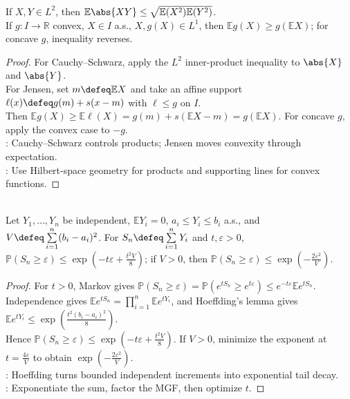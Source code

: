 \begin{theorem} \label{thm:cauchy-schwarz-and-jensen-expectations} \\
If $X,Y\in L^2$, then $\mathbb{E}\abs{XY}\leq\sqrt{\mathbb{E}(X^2)\mathbb{E}(Y^2)}$.\\
If $g:I\to\mathbb{R}$ convex, $X\in I$ a.s., $X,g(X)\in L^1$, then $\mathbb{E}g(X)\geq g(\mathbb{E}X)$; for concave $g$, inequality reverses.
\begin{proof}
For Cauchy--Schwarz, apply the $L^2$ inner-product inequality to $\abs{X}$ and $\abs{Y}$.\\
For Jensen, set $m\defeq\mathbb{E}X$ and take an affine support $\ell(x)\defeq g(m)+s(x-m)$ with $\ell\leq g$ on $I$.\\
Then $\mathbb{E}g(X)\geq\mathbb{E}\ell(X)=g(m)+s(\mathbb{E}X-m)=g(\mathbb{E}X)$. For concave $g$, apply the convex case to $-g$.\\
: Cauchy--Schwarz controls products; Jensen moves convexity through expectation.\\
: Use Hilbert-space geometry for products and supporting lines for convex functions.
\end{proof}
\end{theorem}

\begin{theorem} \label{thm:hoeffding-bounded-zero-mean} \\
Let $Y_1,\ldots,Y_n$ be independent, $\mathbb{E}Y_i=0$, $a_i\leq Y_i\leq b_i$ a.s., and $V\defeq\sum\limits_{i=1}^{n}(b_i-a_i)^2$. For $S_n\defeq\sum\limits_{i=1}^{n}Y_i$ and $t,\varepsilon>0$, $\mathbb{P}(S_n\geq\varepsilon)\leq\exp(-t\varepsilon+\frac{t^2V}{8})$; if $V>0$, then $\mathbb{P}(S_n\geq\varepsilon)\leq\exp(-\frac{2\varepsilon^2}{V})$.
\begin{proof}
For $t>0$, Markov gives $\mathbb{P}(S_n\geq\varepsilon)=\mathbb{P}(e^{tS_n}\geq e^{t\varepsilon})\leq e^{-t\varepsilon}\mathbb{E}e^{tS_n}$.\\
Independence gives $\mathbb{E}e^{tS_n}=\prod\limits_{i=1}^{n}\mathbb{E}e^{tY_i}$, and Hoeffding's lemma gives $\mathbb{E}e^{tY_i}\leq\exp(\frac{t^2(b_i-a_i)^2}{8})$.\\
Hence $\mathbb{P}(S_n\geq\varepsilon)\leq\exp(-t\varepsilon+\frac{t^2V}{8})$. If $V>0$, minimize the exponent at $t=\frac{4\varepsilon}{V}$ to obtain $\exp(-\frac{2\varepsilon^2}{V})$.\\
: Hoeffding turns bounded independent increments into exponential tail decay.\\
: Exponentiate the sum, factor the MGF, then optimize $t$.
\end{proof}
\end{theorem}

